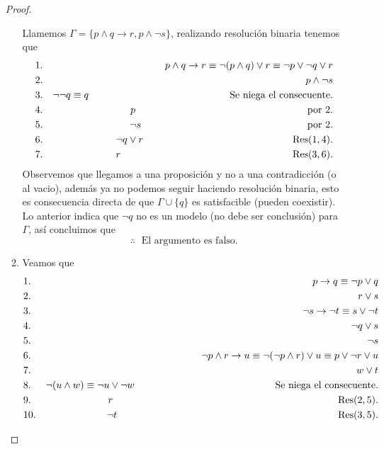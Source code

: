 \documentclass{article}
\begin{document}
\begin{itemize}
\begin{proof}
\begin{enumerate}
      Llamemos $\Gamma = \{p \land q \rightarrow r, p \land \neg s\}$, realizando resolución binaria tenemos que
      \begin{eqnarray*}
        &1.& p \land q \rightarrow r \equiv \neg (p \land q) \lor r \equiv \neg p \lor \neg q \lor r\\
        &2.& p \land \neg s\\
        &3.& \neg \neg q \equiv q \hspace*{5cm} \text{Se niega el consecuente.}\\
        &4.& p \hspace*{6.1cm} \text{por } 2.\\
        &5.& \neg s \hspace*{5.9cm} \text{por } 2.\\
        &6.& \neg q \lor r \hspace*{5.3cm} \text{Res}(1,4).\\
        &7.& r \hspace*{6.1cm} \text{Res}(3,6).
      \end{eqnarray*}
      Observemos que llegamos a una proposición y no a una contradicción (o al vacio), además
      ya no podemos seguir haciendo resolución binaria, esto es consecuencia directa de que $\Gamma \cup \{q\}$
      es satisfacible (pueden coexistir). Lo anterior indica que $\neg q$ no es un modelo (no debe ser conclusión)
      para $\Gamma$, así concluimos que
      \[
      \therefore\; \text{ El argumento es falso.}
      \]
    \item Veamos que
      \begin{eqnarray*}
        &1.& p \rightarrow q \equiv \neg p \lor q\\
        &2.& r \lor s\\
        &3.& \neg s \rightarrow \neg t \equiv s \lor \neg t\\
        &4.& \neg q \lor s\\
        &5.& \neg s\\
        &6.& \neg p \land r \rightarrow  u \equiv \neg (\neg p \land r) \lor u \equiv p \lor \neg r \lor u\\
        &7.& w \lor t\\
        &8.& \neg (u \land w) \equiv \neg u \lor \neg w \hspace*{5cm} \text{Se niega el consecuente.}\\
        &9.& r \hspace*{8cm} \text{Res}(2,5).\\
        &10.& \neg t \hspace*{7.85cm} \text{Res}(3,5).\\

\end{eqnarray*}
\end{enumerate}
\end{proof}
\end{itemize}
\end{document}
